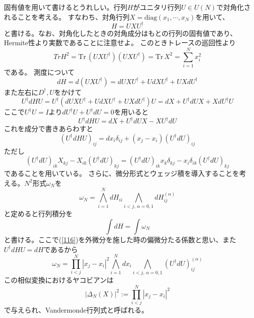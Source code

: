 \documentclass[10pt]{jsreport}
\theoremstyle{definition}%
\newcommand{\Tr}{\mathrm{Tr\,}}
\numberwithin{equation}{section}%
\begin{document}
固有値を用いて書けるとうれしい。行列$H$がユニタリ行列$U\in U(N)$で対角化されることを考える。 
すなわち、対角行列$X=\mathrm{diag}(x_{1},\cdots,x_{N})$を用いて、
\begin{equation}
  H=UXU^{\dagger}
\end{equation}
と書ける。なお、対角化したときの対角成分はもとの行列の固有値であり、Hermite性より実数であることに注意せよ。
このときトレースの巡回性より
\begin{equation}
  Tr H^{2}= \Tr (UXU^{\dagger})(UXU^{\dagger})=\Tr X^{2}=\sum_{i=1}^{N}x_{i}^{2}
\end{equation}
である。
測度について
\begin{equation}
  dH=d(UXU^{\dagger})=dUXU^{\dagger}+UdXU^{\dagger}+UXdU^{\dagger}
\end{equation}
また左右に$D^{\dagger},U$をかけて
\begin{equation}
  U^{\dagger}dHU=U^{\dagger}(dUXU^{\dagger}+UdXU^{\dagger}+UXdU^{\dagger})U=dX + U^{\dagger}dU X+XdU^{\dagger}U
\end{equation}
ここで$U^{\dagger}U=I$より$dU^{\dagger}U+U^{\dagger}dU=0$を用いると
\begin{equation}
  U^{\dagger}dHU=dX + U^{\dagger}dU X-XU^{\dagger}dU
\end{equation}
これを成分で書きあらわすと
\begin{equation}
\label{116}  (U^{\dagger}dHU)_{ij}=dx_{i}\delta_{ij} +(x_{j}-x_{i}) (U^{\dagger}dU)_{ij}
\end{equation}
ただし
\begin{equation}
  (U^{\dagger}dU)_{ik} X_{kj}-X_{ik}(U^{\dagger}dU)_{kj}=(U^{\dagger}dU)_{ik} x_{k}\delta_{kj}-x_{i}\delta_{ik}(U^{\dagger}dU)_{kj}
\end{equation}
であることを用いている。
さらに、微分形式とウェッジ積を導入することを考える。$N^{2}$形式$\omega_{N}$を
\begin{equation}
  \omega_{N}=\bigwedge_{i=1}^{N}dH_{ii}\bigwedge_{i<j , \, \alpha=0,1}dH_{ij}^{(\alpha)}
\end{equation}
と定めると行列積分を
\begin{equation}
  \int dH=\int \omega_{N}
\end{equation}
と書ける。ここで(\ref{116})を外微分を施した時の偏微分たる係数と思い、また$U^{\dagger}dHU=dH$であるから
\begin{equation}
  \omega_{N}=\prod_{i<j}^{N}|x_{j}-x_{i}|^{2}\bigwedge_{i=1}^{N}dx_{i}\bigwedge_{i<j , \, \alpha=0,1}(U^{\dagger}dU)_{ij}^{(\alpha)}
\end{equation}
この相似変換におけるヤコビアンは
\begin{equation}
  |\Delta_{N}(X)|^{2}:=\prod_{i<j}^{N}|x_{j}-x_{i}|^{2}
\end{equation}
で与えられ、Vandermonde行列式と呼ばれる。
\end{document}
